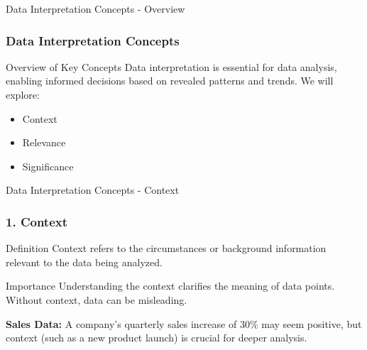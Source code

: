 \documentclass[aspectratio=169]{beamer}
\begin{document}
\begin{frame}[fragile]{Data Interpretation Concepts - Overview}
    \frametitle{Data Interpretation Concepts}
    \begin{block}{Overview of Key Concepts}
        Data interpretation is essential for data analysis, enabling informed decisions based on revealed patterns and trends. 
        We will explore:
        \begin{itemize}
            \item Context
            \item Relevance
            \item Significance
        \end{itemize}
    \end{block}
\end{frame}

\begin{frame}[fragile]{Data Interpretation Concepts - Context}
    \frametitle{1. Context}
    \begin{block}{Definition}
        Context refers to the circumstances or background information relevant to the data being analyzed.
    \end{block}
    \begin{block}{Importance}
        Understanding the context clarifies the meaning of data points. Without context, data can be misleading.
    \end{block}
    \begin{example}
        \textbf{Sales Data:} A company's quarterly sales increase of 30\% may seem positive, but context (such as a new product launch) is crucial for deeper analysis.
    \end{example}
\end{frame}
\end{document}
